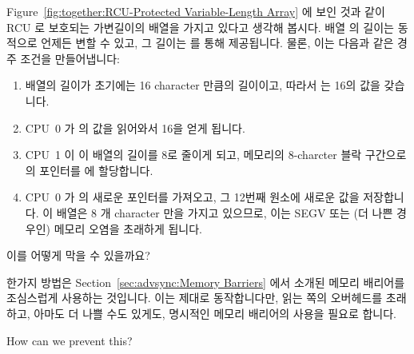 Figure~\ref{fig:together:RCU-Protected Variable-Length Array} 에 보인 것과 같이
RCU 로 보호되는 가변길이의 배열을 가지고 있다고 생각해 봅시다.
배열  의 길이는 동적으로 언제든 변할 수 있고, 그 길이는 
를 통해 제공됩니다.
물론, 이는 다음과 같은 경주 조건을 만들어냅니다:
\iffalse

Suppose we have an RCU-protected variable-length array, as shown in
Figure~\ref{fig:together:RCU-Protected Variable-Length Array}.
The length of the array \co{->a[]} can change dynamically, and at any
given time, its length is given by the field \co{->length}.
Of course, this introduces the following race condition:
\fi

\begin{enumerate}
\item	배열의 길이가 초기에는 16 character 만큼의 길이이고, 따라서
	 는 16의 값을 갖습니다.
\item	CPU~0 가  의 값을 읽어와서 16을 얻게 됩니다.
\item	CPU~1 이 이 배열의 길이를 8로 줄이게 되고, 메모리의 8-charcter 블락
	구간으로의 포인터를  에 할당합니다.
\item	CPU~0 가  의 새로운 포인터를 가져오고, 그 12번째 원소에
	새로운 값을 저장합니다.
	이 배열은 8 개 character 만을 가지고 있으므로, 이는 SEGV 또는 (더 나쁜
	경우인) 메모리 오염을 초래하게 됩니다.
\iffalse

\item	The array is initially 16 characters long, and thus \co{->length}
	is equal to 16.
\item	CPU~0 loads the value of \co{->length}, obtaining the value 16.
\item	CPU~1 shrinks the array to be of length 8, and assigns a pointer
	to a new 8-character block of memory into \co{->a[]}.
\item	CPU~0 picks up the new pointer from \co{->a[]}, and stores a
	new value into element 12.
	Because the array has only 8 characters, this results in
	a SEGV or (worse yet) memory corruption.
\fi
\end{enumerate}

이를 어떻게 막을 수 있을까요?

한가지 방법은
Section~\ref{sec:advsync:Memory Barriers} 에서 소개된 메모리 배리어를
조심스럽게 사용하는 것입니다.
이는 제대로 동작합니다만, 읽는 쪽의 오버헤드를 초래하고, 아마도 더 나쁠 수도
있게도, 명시적인 메모리 배리어의 사용을 필요로 합니다.
\iffalse

How can we prevent this?

